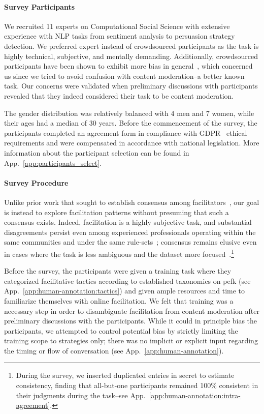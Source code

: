\documentclass[11pt]{article}
\theoremstyle{definition}
\theoremstyle{plain}
\begin{document}
\paragraph{Survey Participants}
We recruited 11 experts on Computational Social Science with extensive experience with NLP tasks from sentiment analysis to persuasion strategy detection. 
We preferred expert instead of crowdsourced participants as the task is highly technical, subjective, and mentally demanding. Additionally, crowdsourced participants have been shown to exhibit more bias in general~\citep{snow-etal-2008-cheap, waseem-2016-racist}, which concerned us since we tried to avoid confusion with content moderation--a better known task. Our concerns were validated when preliminary discussions with participants revealed that they indeed considered their task to be content moderation.

The gender distribution was relatively balanced with 4 men and 7 women, while their ages had a median of 30 years. Before the commencement of the survey, the participants completed an agreement form in compliance with GDPR~\citep{GDPR} ethical requirements and were compensated in accordance with national legislation. More information about the participant selection can be found in App.~\ref{app:participants_select}.

\paragraph{Survey Procedure} 
Unlike prior work that sought to establish consensus among facilitators~\cite{umod, schroeder-etal-2024-fora, chen-etal-2025-whow}, our goal is instead to explore facilitation patterns without presuming that such a consensus exists. Indeed, facilitation is a highly subjective task, and substantial disagreements persist even among experienced professionals operating within the same communities and under the same rule-sets~\citep{vinay2024_venire}; consensus remains elusive even in cases where the task is less ambiguous and the dataset more focused~\citep{schroeder-etal-2024-fora}.\footnote{During the survey, we inserted duplicated entries in secret to estimate consistency, finding that all-but-one participants remained 100\% consistent in their judgments during the task--see App.~\ref{app:human-annotation:intra-agreement}.}

Before the survey, the participants were given a training task where they categorized facilitative tactics according to established taxonomies on \ac{pefk} (see App.~\ref{app:human-annotation:tactics}) and given ample resources and time to familiarize themselves with online facilitation. We felt that training was a necessary step in order to disambiguate facilitation from content moderation after preliminary discussions with the participants. While it could in principle bias the participants, we attempted to control potential bias by strictly limiting the training scope to strategies only; there was no implicit or explicit input regarding the timing or flow of conversation (see App.~\ref{app:human-annotation}).
\end{document}

